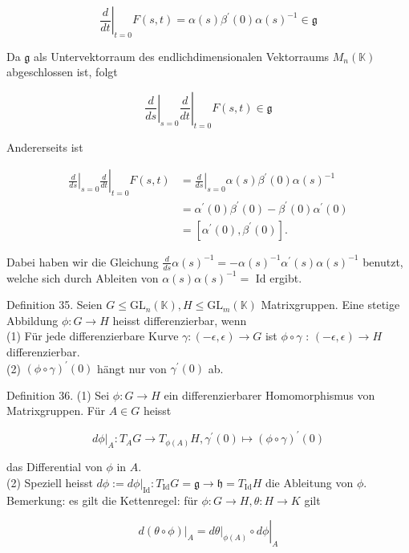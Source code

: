\documentclass[10pt, letterpaper]{article}
\begin{document}
$$
\left.\frac{d}{d t}\right|_{t=0} F(s, t)=\alpha(s) \beta^{\prime}(0) \alpha(s)^{-1} \in \mathfrak{g}
$$

Da $\mathfrak{g}$ als Untervektorraum des endlichdimensionalen Vektorraums $M_{n}(\mathbb{K})$ abgeschlossen ist, folgt

$$
\left.\left.\frac{d}{d s}\right|_{s=0} \frac{d}{d t}\right|_{t=0} F(s, t) \in \mathfrak{g}
$$

Andererseits ist

$$
\begin{aligned}
\left.\left.\frac{d}{d s}\right|_{s=0} \frac{d}{d t}\right|_{t=0} F(s, t) & =\left.\frac{d}{d s}\right|_{s=0} \alpha(s) \beta^{\prime}(0) \alpha(s)^{-1} \\
& =\alpha^{\prime}(0) \beta^{\prime}(0)-\beta^{\prime}(0) \alpha^{\prime}(0) \\
& =\left[\alpha^{\prime}(0), \beta^{\prime}(0)\right] .
\end{aligned}
$$

Dabei haben wir die Gleichung $\frac{d}{d s} \alpha(s)^{-1}=-\alpha(s)^{-1} \alpha^{\prime}(s) \alpha(s)^{-1}$ benutzt, welche sich durch Ableiten von $\alpha(s) \alpha(s)^{-1}=$ Id ergibt.

Definition 35. Seien $G \leq \mathrm{GL}_{n}(\mathbb{K}), H \leq \mathrm{GL}_{m}(\mathbb{K})$ Matrixgruppen. Eine stetige Abbildung $\phi: G \rightarrow H$ heisst differenzierbar, wenn\\
(1) Für jede differenzierbare Kurve $\gamma:(-\epsilon, \epsilon) \rightarrow G$ ist $\phi \circ \gamma$ : $(-\epsilon, \epsilon) \rightarrow H$ differenzierbar.\\
(2) $(\phi \circ \gamma)^{\prime}(0)$ hängt nur von $\gamma^{\prime}(0)$ ab.

Definition 36. (1) Sei $\phi: G \rightarrow H$ ein differenzierbarer Homomorphismus von Matrixgruppen. Für $A \in G$ heisst

$$
\left.d \phi\right|_{A}: T_{A} G \rightarrow T_{\phi(A)} H, \gamma^{\prime}(0) \mapsto(\phi \circ \gamma)^{\prime}(0)
$$

das Differential von $\phi$ in $A$.\\
(2) Speziell heisst $d \phi:=\left.d \phi\right|_{\mathrm{Id}}: T_{\mathrm{Id}} G=\mathfrak{g} \rightarrow \mathfrak{h}=T_{\mathrm{Id}} H$ die Ableitung von $\phi$.\\
Bemerkung: es gilt die Kettenregel: für $\phi: G \rightarrow H, \theta: H \rightarrow K$ gilt

$$
\left.d(\theta \circ \phi)\right|_{A}=\left.\left.d \theta\right|_{\phi(A)} \circ d \phi\right|_{A}
$$
\end{document}
